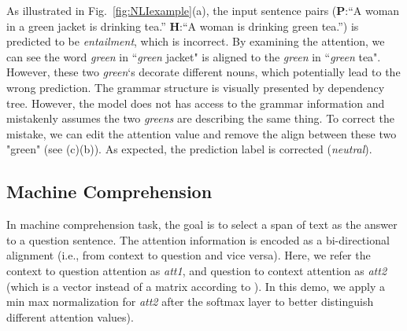 As illustrated in Fig.~\ref{fig:NLIexample}(a), the input sentence pairs (\textbf{P}:``A woman in a green jacket is drinking tea.'' \textbf{H}:``A woman is drinking green tea.'') is predicted to be \emph{entailment}, which is incorrect.
By examining the attention, we can see the word \emph{green} in ``\emph{green} jacket" is aligned to the \emph{green} in ``\emph{green} tea". However, these two \emph{green}`s decorate different nouns, which potentially lead to the wrong prediction. The grammar structure is visually presented by dependency tree.
However, the model does not has access to the grammar information and mistakenly assumes the two \emph{greens} are describing the same thing.
%
To correct the mistake, we can edit the attention value and remove the align between these two "green" (see (c)(b)).
As expected, the prediction label is corrected (\emph{neutral}).

\subsection{Machine Comprehension}
\label{sec:MCexample}
In machine comprehension task, the goal is to select a span of text as the answer
to a question sentence.
The attention information is encoded as a bi-directional alignment (i.e., from context to question and vice versa). 
Here, we refer the context to question attention as \emph{att1}, and question to context attention as \emph{att2} (which is a vector instead of a matrix according to \citet{Seo2016}). In this demo, we apply a min max normalization for \emph{att2} after the softmax layer to better distinguish different attention values).

